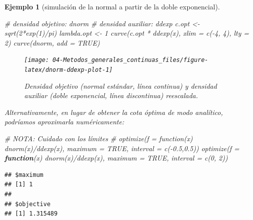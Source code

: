 \documentclass[
]{book}
\newenvironment{Shaded}{\begin{snugshade}}{\end{snugshade}}
\newcommand{\AttributeTok}[1]{\textcolor[rgb]{0.77,0.63,0.00}{#1}}
\newcommand{\CommentTok}[1]{\textcolor[rgb]{0.56,0.35,0.01}{\textit{#1}}}
\newcommand{\ConstantTok}[1]{\textcolor[rgb]{0.00,0.00,0.00}{#1}}
\newcommand{\ControlFlowTok}[1]{\textcolor[rgb]{0.13,0.29,0.53}{\textbf{#1}}}
\newcommand{\DecValTok}[1]{\textcolor[rgb]{0.00,0.00,0.81}{#1}}
\newcommand{\FunctionTok}[1]{\textcolor[rgb]{0.00,0.00,0.00}{#1}}
\newcommand{\NormalTok}[1]{#1}
\newcommand{\OtherTok}[1]{\textcolor[rgb]{0.56,0.35,0.01}{#1}}
\newcommand{\SpecialCharTok}[1]{\textcolor[rgb]{0.00,0.00,0.00}{#1}}
\theoremstyle{break}
\newtheorem{example}{Ejemplo}[chapter]
\theoremstyle{nonumberplain}
\begin{document}
\begin{example}[simulación de la normal a partir de la doble exponencial]
\begin{Shaded}
\begin{Highlighting}[]
\CommentTok{\# densidad objetivo: dnorm}
\CommentTok{\# densidad auxiliar: ddexp}
\NormalTok{c.opt }\OtherTok{\textless{}{-}} \FunctionTok{sqrt}\NormalTok{(}\DecValTok{2}\SpecialCharTok{*}\FunctionTok{exp}\NormalTok{(}\DecValTok{1}\NormalTok{)}\SpecialCharTok{/}\NormalTok{pi)}
\NormalTok{lambda.opt }\OtherTok{\textless{}{-}} \DecValTok{1}
\FunctionTok{curve}\NormalTok{(c.opt }\SpecialCharTok{*} \FunctionTok{ddexp}\NormalTok{(x), }\AttributeTok{xlim =} \FunctionTok{c}\NormalTok{(}\SpecialCharTok{{-}}\DecValTok{4}\NormalTok{, }\DecValTok{4}\NormalTok{), }\AttributeTok{lty =} \DecValTok{2}\NormalTok{)}
\FunctionTok{curve}\NormalTok{(dnorm, }\AttributeTok{add =} \ConstantTok{TRUE}\NormalTok{)}
\end{Highlighting}
\end{Shaded}

\begin{figure}[!htb]

{\centering \texttt{[image: 04-Metodos\_generales\_continuas\_files/figure-latex/dnorm-ddexp-plot-1]} 

}

\caption{Densidad objetivo (normal estándar, línea continua) y densidad auxiliar (doble exponencial, línea discontinua) reescalada.}\label{fig:dnorm-ddexp-plot}
\end{figure}

Alternativamente, en lugar de obtener la cota óptima de modo analítico, podríamos aproximarla numéricamente:

\begin{Shaded}
\begin{Highlighting}[]
\CommentTok{\# NOTA: Cuidado con los límites}
\CommentTok{\# optimize(f = function(x) dnorm(x)/ddexp(x), maximum = TRUE, interval = c({-}0.5,0.5))}
\FunctionTok{optimize}\NormalTok{(}\AttributeTok{f =} \ControlFlowTok{function}\NormalTok{(x) }\FunctionTok{dnorm}\NormalTok{(x)}\SpecialCharTok{/}\FunctionTok{ddexp}\NormalTok{(x), }\AttributeTok{maximum =} \ConstantTok{TRUE}\NormalTok{, }\AttributeTok{interval =} \FunctionTok{c}\NormalTok{(}\DecValTok{0}\NormalTok{, }\DecValTok{2}\NormalTok{))}
\end{Highlighting}
\end{Shaded}

\begin{verbatim}
## $maximum
## [1] 1
## 
## $objective
## [1] 1.315489
\end{verbatim}


\end{example}
\end{document}
